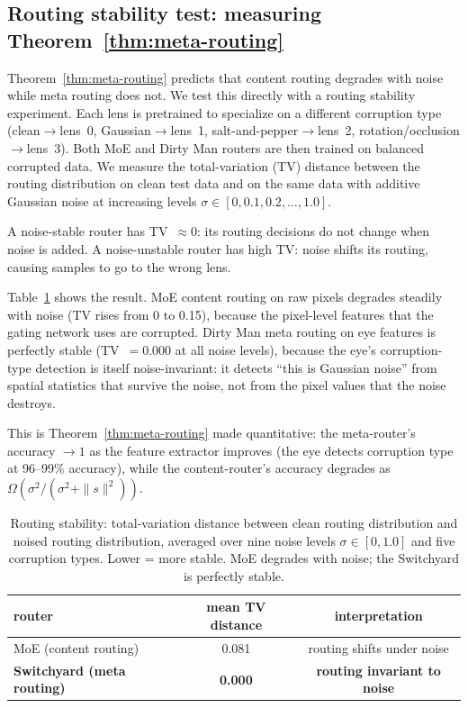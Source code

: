 \documentclass[11pt,a4paper]{article}
\begin{document}
\subsection{Routing stability test: measuring Theorem~\ref{thm:meta-routing}}
\label{sec:stability-test}

Theorem~\ref{thm:meta-routing} predicts that content routing degrades with noise
while meta routing does not. We test this directly with a routing stability
experiment. Each lens is pretrained to specialize on a different corruption type
(clean$\to$lens~0, Gaussian$\to$lens~1, salt-and-pepper$\to$lens~2,
rotation/occlusion$\to$lens~3). Both MoE and Dirty Man routers are then trained
on balanced corrupted data. We measure the total-variation (TV) distance between
the routing distribution on clean test data and on the same data with additive
Gaussian noise at increasing levels $\sigma \in [0, 0.1, 0.2, \dots, 1.0]$.

A noise-stable router has TV~$\approx 0$: its routing decisions do not change
when noise is added. A noise-unstable router has high TV: noise shifts its
routing, causing samples to go to the wrong lens.

Table~\ref{tab:stability} shows the result. MoE content routing on raw pixels
degrades steadily with noise (TV rises from 0 to 0.15), because the pixel-level
features that the gating network uses are corrupted. Dirty Man meta routing on
eye features is perfectly stable (TV~$= 0.000$ at all noise levels), because the
eye's corruption-type detection is itself noise-invariant: it detects ``this is
Gaussian noise'' from spatial statistics that survive the noise, not from the
pixel values that the noise destroys.

This is Theorem~\ref{thm:meta-routing} made quantitative: the meta-router's
accuracy $\to 1$ as the feature extractor improves (the eye detects corruption
type at 96--99\% accuracy), while the content-router's accuracy degrades as
$\Omega(\sigma^2 / (\sigma^2 + \|s\|^2))$.

\begin{table}[t]
  \centering
  \caption{Routing stability: total-variation distance between clean routing
distribution and noised routing distribution, averaged over nine noise levels
$\sigma \in [0, 1.0]$ and five corruption types. Lower = more stable.
MoE degrades with noise; the Switchyard is perfectly stable.}
  \label{tab:stability}
  \begin{tabular}{lcc}
    \toprule
    router & mean TV distance & interpretation \\
    \midrule
    MoE (content routing) & 0.081 & routing shifts under noise \\
    \textbf{Switchyard (meta routing)} & \textbf{0.000} & \textbf{routing invariant to noise} \\
    \bottomrule
  \end{tabular}
\end{table}
\end{document}

